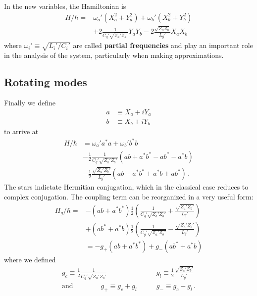 \documentclass{article}
\begin{document}
In the new variables, the Hamiltonian is
\begin{align}
  H / \hbar
  =& \omega_a' \left(X_a^2 + Y_a^2 \right)
  +  \omega_b' \left(X_b^2 + Y_b^2 \right) \nonumber \\
  &+ 2 \frac{1}{C_g' \sqrt{Z_a' Z_b'}} Y_a Y_b
   - 2 \frac{\sqrt{Z_a Z_b}}{L_g'} X_a X_b
\end{align}
where $\omega_i' \equiv \sqrt{L_i' / C_i'}$ are called \textbf{partial frequencies} and play an important role in the analysis of the system, particularly when making approximations.

\subsection{Rotating modes}

Finally we define
\begin{align}
  a &\equiv X_a + i Y_a \nonumber \\
  b &\equiv X_b + i Y_b
\end{align}
to arrive at
\begin{align}
  H / \hbar
  &= \omega_a' a^* a + \omega_b' b^* b \nonumber \\
  & - \frac{1}{2} \frac{1}{C_g' \sqrt{Z_a' Z_b'}} (ab + a^* b^* - a b^* - a^* b) \nonumber \\
  &- \frac{1}{2} \frac{\sqrt{Z_a' Z_b'}}{L_g'} (ab + a^* b^* + a^* b + a b^*)
  \, .
\end{align}
The stars indictate Hermitian conjugation, which in the classical case reduces to complex conjugation.
The coupling term can be reorganized in a very useful form:
\begin{align}
  H_g / \hbar =
  &- \left( a b + a^* b^* \right)
    \frac{1}{2} \left(
      \frac{1}{C_g' \sqrt{Z_a' Z_b'}} + \frac{\sqrt{Z_a' Z_b'}}{L_g'}
    \right) \nonumber \\
  &+ \left( a b^* + a^* b \right)
    \frac{1}{2} \left(
      \frac{1}{C_g' \sqrt{Z_a' Z_b'}} - \frac{\sqrt{Z_a' Z_b'}}{L_g'}
    \right) \nonumber \\
  &= -g_+ (ab + a^* b^*) + g_- (ab^* + a^* b)
\end{align}
where we defined
\begin{align}
  g_c \equiv \frac{1}{2} \frac{1}{C_g' \sqrt{Z_a' Z_b'}} &\qquad
  g_l \equiv \frac{1}{2} \frac{\sqrt{Z_a' Z_b'}}{L_g'} \nonumber \\
  \text{and} \qquad \qquad
  g_+ \equiv g_c + g_l &\qquad g_- \equiv g_c - g_l
  \, .
\end{align}
\end{document}
